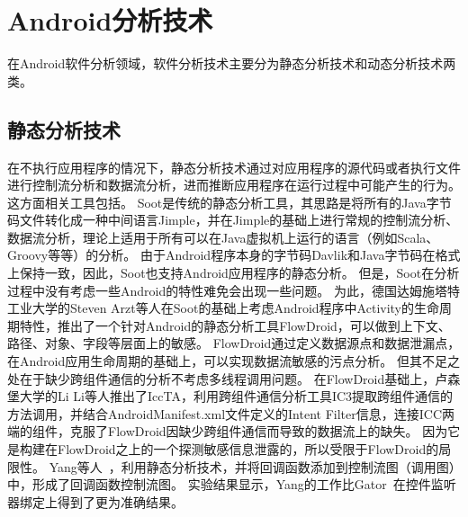 \section{Android分析技术}

在Android软件分析领域，软件分析技术主要分为静态分析技术和动态分析技术两类。

\subsection{静态分析技术}


在不执行应用程序的情况下，静态分析技术通过对应用程序的源代码或者执行文件进行控制流分析和数据流分析，进而推断应用程序在运行过程中可能产生的行为。
这方面相关工具包括\cite{vallee1999soot,arzt2014flowdroid,AmanDroid,iccta,androguard:online,pxb1988d85,javadeco45,iBotPeac46,maaaazan93}。
Soot\cite{vallee1999soot}是传统的静态分析工具，其思路是将所有的Java字节码文件转化成一种中间语言Jimple，并在Jimple的基础上进行常规的控制流分析、数据流分析，理论上适用于所有可以在Java虚拟机上运行的语言（例如Scala、Groovy等等）的分析。
由于Android程序本身的字节码Davlik和Java字节码在格式上保持一致，因此，Soot也支持Android应用程序的静态分析。
但是，Soot在分析过程中没有考虑一些Android的特性难免会出现一些问题。
为此，德国达姆施塔特工业大学的Steven Arzt等人在Soot的基础上考虑Android程序中Activity的生命周期特性，推出了一个针对Android的静态分析工具FlowDroid\cite{arzt2014flowdroid}，可以做到上下文、路径、对象、字段等层面上的敏感。
FlowDroid通过定义数据源点和数据泄漏点，在Android应用生命周期的基础上，可以实现数据流敏感的污点分析。
但其不足之处在于缺少跨组件通信的分析不考虑多线程调用问题。
在FlowDroid基础上，卢森堡大学的Li Li等人推出了IccTA\cite{iccta}，利用跨组件通信分析工具IC3提取跨组件通信的方法调用，并结合AndroidManifest.xml文件定义的Intent Filter信息，连接ICC两端的组件，克服了FlowDroid因缺少跨组件通信而导致的数据流上的缺失。
因为它是构建在FlowDroid之上的一个探测敏感信息泄露的，所以受限于FlowDroid的局限性。
Yang等人~\cite{yang2015static}，利用静态分析技术，并将回调函数添加到控制流图（调用图）中，形成了回调函数控制流图。
实验结果显示，Yang的工作比Gator~\cite{rountev2014static}在控件监听器绑定上得到了更为准确结果。



